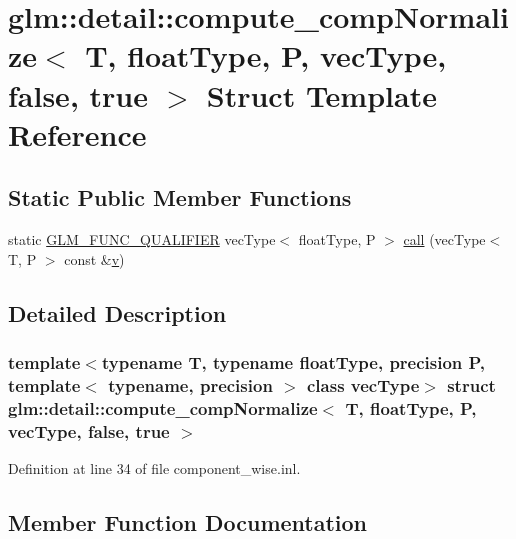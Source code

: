 \hypertarget{structglm_1_1detail_1_1compute__comp_normalize_3_01_t_00_01float_type_00_01_p_00_01vec_type_00_01false_00_01true_01_4}{}\section{glm\+::detail\+::compute\+\_\+comp\+Normalize$<$ T, float\+Type, P, vec\+Type, false, true $>$ Struct Template Reference}
\label{structglm_1_1detail_1_1compute__comp_normalize_3_01_t_00_01float_type_00_01_p_00_01vec_type_00_01false_00_01true_01_4}
\subsection*{Static Public Member Functions}
\begin{DoxyCompactItemize}
\item 
static \mbox{\hyperlink{setup_8hpp_a33fdea6f91c5f834105f7415e2a64407}{G\+L\+M\+\_\+\+F\+U\+N\+C\+\_\+\+Q\+U\+A\+L\+I\+F\+I\+ER}} vec\+Type$<$ float\+Type, P $>$ \mbox{\hyperlink{structglm_1_1detail_1_1compute__comp_normalize_3_01_t_00_01float_type_00_01_p_00_01vec_type_00_01false_00_01true_01_4_a235bbd9a5c21afab67a9f61705a3fcc5}{call}} (vec\+Type$<$ T, P $>$ const \&\mbox{\hyperlink{glad_8h_a14cfbe2fc2234f5504618905b69d1e06}{v}})
\end{DoxyCompactItemize}


\subsection{Detailed Description}
\subsubsection*{template$<$typename T, typename float\+Type, precision P, template$<$ typename, precision $>$ class vec\+Type$>$\newline
struct glm\+::detail\+::compute\+\_\+comp\+Normalize$<$ T, float\+Type, P, vec\+Type, false, true $>$}



Definition at line 34 of file component\+\_\+wise.\+inl.



\subsection{Member Function Documentation}
\mbox{\label{structglm_1_1detail_1_1compute__comp_normalize_3_01_t_00_01float_type_00_01_p_00_01vec_type_00_01false_00_01true_01_4_a235bbd9a5c21afab67a9f61705a3fcc5}} 
